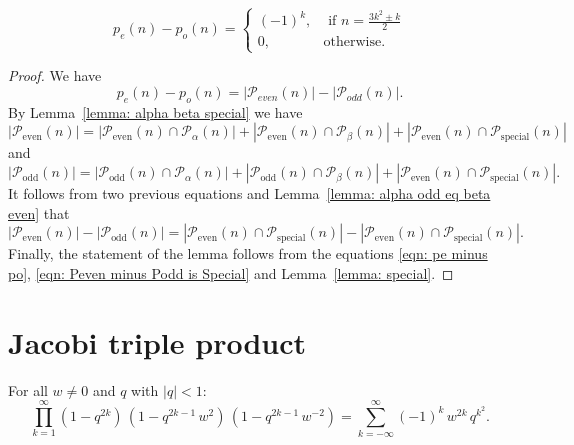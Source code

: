 \begin{lemma} \leanok
$$p_e(n)-p_o(n)=
\begin{cases}(-1)^k,&\mbox{ if } n= \frac{3k^2\pm k}{2}\\
0, & \mbox{otherwise.}\end{cases}$$
\end{lemma}
\begin{proof}\leanok
We have
\begin{equation}\label{eqn: pe minus po}p_e(n)-p_o(n)=\left|\mathcal{P}_{even}(n)\right|-\left|\mathcal{P}_{odd}(n)\right|.\end{equation}
By Lemma~\ref{lemma: alpha beta special} we have
$$\left|\mathcal{P}_{\mathrm{even}}(n)\right|=\left|\mathcal{P}_{\mathrm{even}}(n)\cap \mathcal{P}_{\alpha}(n)\right|+\left|\mathcal{P}_{\mathrm{even}}(n) \cap \mathcal{P}_{\beta}(n)\right|+\left|\mathcal{P}_{\mathrm{even}}(n)\cap \mathcal{P}_{\mathrm{special}}(n)\right|$$
and
$$\left|\mathcal{P}_{\mathrm{odd}}(n)\right|=\left|\mathcal{P}_{\mathrm{odd}}(n)\cap \mathcal{P}_{\alpha}(n)\right|+\left|\mathcal{P}_{\mathrm{odd}}(n) \cap \mathcal{P}_{\beta}(n)\right|+\left|\mathcal{P}_{\mathrm{even}}(n)\cap \mathcal{P}_{\mathrm{special}}(n)\right|.$$
It follows from two previous equations and Lemma~\ref{lemma: alpha odd eq beta even} that
\begin{equation}\label{eqn: Peven minus Podd is Special}\left|\mathcal{P}_{\mathrm{even}}(n)\right|-\left|\mathcal{P}_{\mathrm{odd}}(n)\right| =\left|\mathcal{P}_{\mathrm{even}}(n)\cap \mathcal{P}_{\mathrm{special}}(n)\right|-\left|\mathcal{P}_{\mathrm{even}}(n)\cap \mathcal{P}_{\mathrm{special}}(n)\right|.\end{equation}
Finally, the statement of the lemma follows from the equations \eqref{eqn: pe minus po}, \eqref{eqn: Peven minus Podd is Special} and Lemma~\ref{lemma: special}.
\end{proof}

\section{Jacobi triple product}
\begin{theorem}[Jacobi] \leanok
For all $w\neq 0$ and $q$ with $|q|<1$:
$$\prod_{k=1}^\infty (1-q^{2k})\,(1-q^{2k-1}\,w^2)\,(1-q^{2k-1}\,w^{-2})=\sum_{k=-\infty}^\infty (-1)^k\,w^{2k}\,q^{k^2}.$$
\end{theorem}


